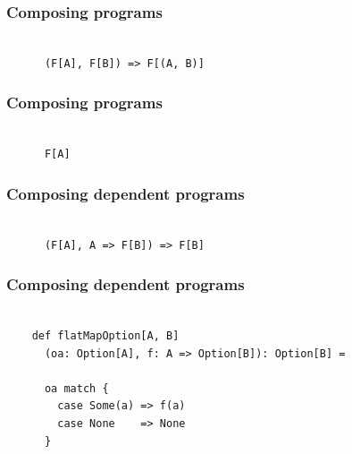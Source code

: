 \documentclass{beamer}
\begin{document}
\begin{frame}[fragile]

  \frametitle{Composing programs}

  \centering
  \LARGE

  \begin{minipage}{1.0\textwidth}
    \begin{verbatim}

      (F[A], F[B]) => F[(A, B)]

    \end{verbatim}
  \end{minipage}

\end{frame}

\begin{frame}[fragile]

  \frametitle{Composing programs}

  \centering
  \LARGE

  \begin{minipage}{0.42\textwidth}
    \begin{verbatim}

      F[A]

    \end{verbatim}
  \end{minipage}

\end{frame}

\begin{frame}[fragile]

  \frametitle{Composing dependent programs}

  \centering
  \LARGE

  \begin{minipage}{1.0\textwidth}
    \begin{verbatim}

      (F[A], A => F[B]) => F[B]

    \end{verbatim}
  \end{minipage}

\end{frame}

\begin{frame}[fragile]

  \frametitle{Composing dependent programs}

  \begin{verbatim}

    def flatMapOption[A, B]
      (oa: Option[A], f: A => Option[B]): Option[B] =

      oa match {
        case Some(a) => f(a)
        case None    => None
      }

  \end{verbatim}

\end{frame}
\end{document}
